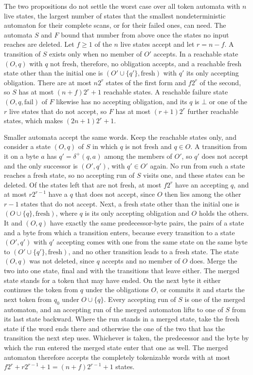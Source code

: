 \documentclass[11pt,a4paper]{article}
\theoremstyle{definition}
\theoremstyle{plain}
\begin{document}
The two propositions do not settle the worst case over all token automata with $n$ live states, the largest number of
states that the smallest nondeterministic automaton for their complete scans, or for their failed ones, can need. The
automata $S$ and $F$ bound that number from above once the states no input reaches are deleted. Let $f \geq 1$ of the
$n$ live states accept and let $r = n - f$. A transition of $S$ exists only when no member of $O'$ accepts. In a
reachable state $(O, q)$ with $q$ not fresh, therefore, no obligation accepts, and a reachable fresh state other than
the initial one is $(O' \cup \{q'\}, \mathrm{fresh})$ with $q'$ its only accepting obligation. There are at most $n 2^r$
states of the first form and $f 2^r$ of the second, so $S$ has at most $(n + f)2^r + 1$ reachable states. A reachable
failure state $(O, q, \mathrm{fail})$ of $F$ likewise has no accepting obligation, and its $q$ is $\bot$ or one of the
$r$ live states that do not accept, so $F$ has at most $(r + 1)2^r$ further reachable states, which makes
$(2n + 1)2^r + 1$.

Smaller automata accept the same words. Keep the reachable states only, and consider a state $(O, q)$ of $S$ in which
$q$ is not fresh and $q \in O$. A transition from it on a byte $a$ has $q' = \delta^+(q, a)$ among the members of $O'$,
so $q'$ does not accept and the only successor is $(O', q')$, with $q' \in O'$ again. No run from such a state reaches a
fresh state, so no accepting run of $S$ visits one, and these states can be deleted. Of the states left that are not
fresh, at most $f 2^r$ have an accepting $q$, and at most $r 2^{r-1}$ have a $q$ that does not accept, since $O$ then
lies among the other $r - 1$ states that do not accept. Next, a fresh state other than the initial one is
$(O \cup \{q\}, \mathrm{fresh})$, where $q$ is its only accepting obligation and $O$ holds the others. It and $(O, q)$
have exactly the same predecessor-byte pairs, the pairs of a state and a byte from which a transition enters, because
every transition to a state $(O', q')$ with $q'$ accepting comes with one from the same state on the same byte to
$(O' \cup \{q'\}, \mathrm{fresh})$, and no other transition leads to a fresh state. The state $(O, q)$ was not deleted,
since $q$ accepts and no member of $O$ does. Merge the two into one state, final and with the transitions that leave
either. The merged state stands for a token that may have ended. On the next byte it either continues the token from $q$
under the obligations $O$, or commits it and starts the next token from $q_0$ under $O \cup \{q\}$. Every accepting run
of $S$ is one of the merged automaton, and an accepting run of the merged automaton lifts to one of $S$ from its last
state backward. Where the run stands in a merged state, take the fresh state if the word ends there and otherwise the
one of the two that has the transition the next step uses. Whichever is taken, the predecessor and the byte by which the
run entered the merged state enter that one as well. The merged automaton therefore accepts the completely tokenizable
words with at most $f 2^r + r 2^{r-1} + 1 = (n + f)2^{r-1} + 1$ states.
\end{document}
